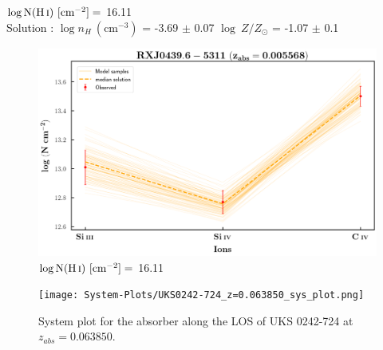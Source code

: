   
  $\log \text{N}(\ion{H}{i}) \ [\text{cm}^{-2}]=$  16.11  \\ 
  
  Solution : $\log n_H \ (\text{cm}^{-3})$ = -3.69 $\pm$ 0.07 \hspace{10mm} $\log \ Z/Z_\odot$ = -1.07 $\pm$ 0.1 \newline
  
  \begin{figure}[!h]
      \centering
      \includegraphics[width=0.85\linewidth]{Ionisation-Modelling-Plots/rxj0439-z=0.005568-compII_logZ=-1.png}
      \caption{$\log \text{N}(\ion{H}{i}) \ [\text{cm}^{-2}]=$ 16.11}
  \end{figure}
  
  
  
  \newpage
  
  \begin{landscape}
  
  \begin{figure}
      \centering
      \vspace{-20mm}
      \hspace*{-35mm}
      \texttt{[image: System-Plots/UKS0242-724\_z=0.063850\_sys\_plot.png]}
      \caption{System plot for the absorber along the LOS of UKS 0242-724 at $z_{abs} = 0.063850$. }
  \end{figure}
  
  \end{landscape}
  
